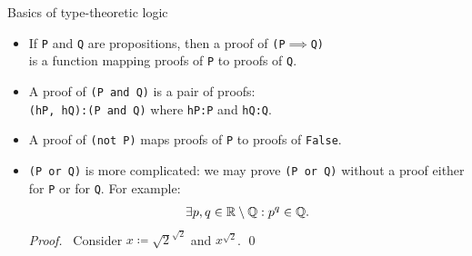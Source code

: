 \documentclass{beamer}
\begin{document}
\begin{frame}{Basics of type-theoretic logic}

  \begin{itemize}[<+->]
    \item If \texttt{P} and \texttt{Q} are propositions,
      then a proof of \texttt{(P}$\implies$\texttt{Q)} \\
      is a function mapping proofs of \texttt{P}
      to proofs of \texttt{Q}.
    \item A proof of \texttt{(P and Q)} is a pair of proofs: \\
      \texttt{(hP, hQ):(P and Q)} where
      \texttt{hP:P} and \texttt{hQ:Q}.
    \item A proof of \texttt{(not P)} maps
      proofs of \texttt{P} to proofs of \texttt{False}.
    \item \texttt{(P or Q)} is more complicated:
      we may prove \texttt{(P or Q)} without a proof either
      for \texttt{P} or for \texttt{Q}. For example:
      \begin{align*}
        \exists p, q \in {\mathbb{R}} \setminus {\mathbb{Q}}:
        p^q \in {\mathbb{Q}}.
      \end{align*}
      \emph{Proof.} \
      Consider $x \coloneqq \sqrt{2}^{\sqrt{2}}$ and
      $x^{\sqrt 2}$.
      \qed
  \end{itemize}
\end{frame}
\end{document}
